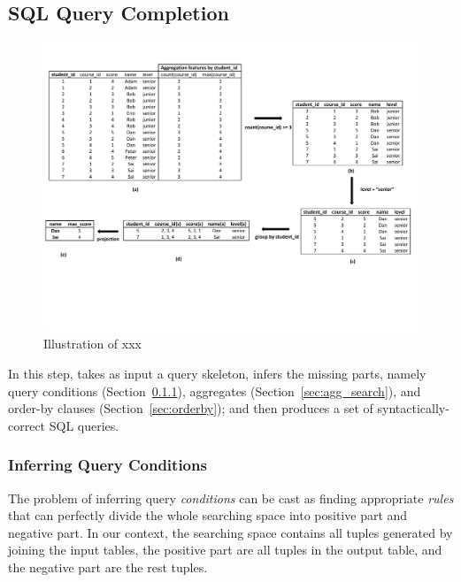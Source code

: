 \subsection{SQL Query Completion}
\label{sec:completion}


\begin{figure}[t]
  \centering
  \includegraphics[scale=0.65]{fullexample}
  \vspace*{-1.0ex}\caption {{\label{fig:fullexample}
  Illustration of xxx 
}}

\end{figure}

In this step, \ourtool takes as input a query skeleton, infers
the missing parts, namely query conditions (Section~\ref{sec:condition}),
aggregates (Section~\ref{sec:agg_search}), and order-by clauses (Section~\ref{sec:orderby}); and then produces a
set of syntactically-correct SQL queries.


\subsubsection{Inferring Query Conditions}
\label{sec:condition}

The problem of inferring query \textit{conditions} can be cast as finding
appropriate \textit{rules} that can perfectly divide the whole searching space
into positive part and negative part. In our context, the searching space
contains all tuples generated by joining the input tables, the positive part
are all tuples in the output table, and the negative part are the rest
tuples.

